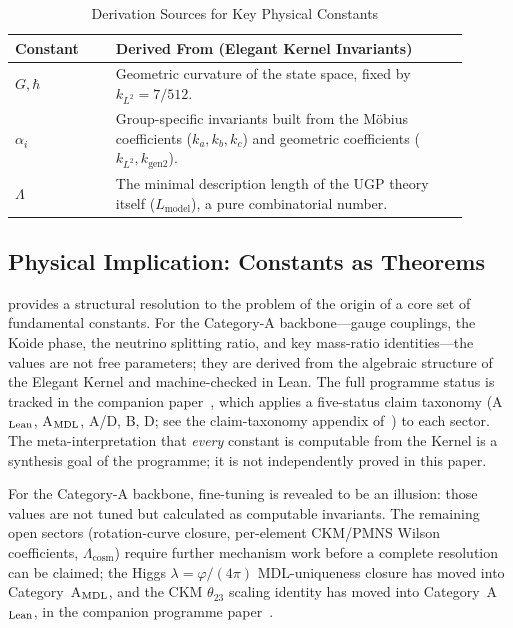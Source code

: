 \documentclass[12pt]{article}
\begin{document}
\begin{table}[h!]
\centering
\caption{Derivation Sources for Key Physical Constants}
\label{tab:constants_summary}
\begin{tabular}{p{0.2\linewidth} p{0.7\linewidth}}
\toprule
\textbf{Constant} & \textbf{Derived From (Elegant Kernel Invariants)} \\
\midrule
$G, \hbar$ & Geometric curvature of the state space, fixed by $k_{L^2} = 7/512$. \\
$\alpha_i$ & Group-specific invariants built from the Möbius coefficients ($k_a, k_b, k_c$) and geometric coefficients ($k_{L^2}, k_{\text{gen2}}$). \\
$\Lambda$ & The minimal description length of the UGP theory itself ($L_{\text{model}}$), a pure combinatorial number. \\
\bottomrule
\end{tabular}
\end{table}

\subsection{Physical Implication: Constants as Theorems}
 provides a structural resolution to the problem of the origin of a core set of fundamental constants.
For the Category-A backbone---gauge couplings, the Koide phase, the neutrino splitting ratio, and key mass-ratio identities---the values are not free parameters; they are derived from the algebraic structure of the Elegant Kernel and machine-checked in Lean.
The full programme status is tracked in the companion paper~\cite{Spivack2026_SM_UGP}, which applies a five-status claim taxonomy (A$_{\rm Lean}$, A$_{\rm MDL}$, A/D, B, D; see the claim-taxonomy appendix of~\cite{Spivack2026_SM_UGP}) to each sector.
The meta-interpretation that \emph{every} constant is computable from the Kernel is a synthesis goal of the programme; it is not independently proved in this paper.

For the Category-A backbone, fine-tuning is revealed to be an illusion: those values are not tuned but calculated as computable invariants.
The remaining open sectors (rotation-curve closure, per-element CKM/PMNS Wilson coefficients, $\Lambda_{\mathrm{cosm}}$) require further mechanism work before a complete resolution can be claimed; the Higgs $\lambda = \varphi/(4\pi)$ MDL-uniqueness closure has moved into Category~A$_{\rm MDL}$, and the CKM $\theta_{23}$ scaling identity has moved into Category~A$_{\rm Lean}$, in the companion programme paper~\cite{Spivack2026_SM_UGP}.
\end{document}
